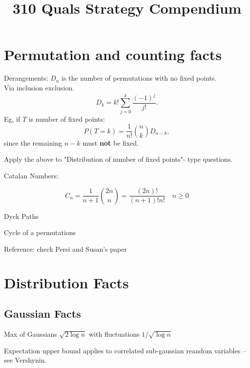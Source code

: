 \documentclass{article}
\title{310 Quals Strategy Compendium}
\begin{document}
\maketitle

\section{Permutation and counting facts}
\begin{fact}
Derangements: $D_n$ is the number of permutations with no fixed points.\\

Via inclusion exclusion.
$$D_k = k! \sum_{j=0}^{k} \frac{(-1)^j}{j!}.$$
Eg, if $T$ is number of fixed points:
$$P(T=k) = \frac{1}{n!} \binom{n}{k} D_{n-k},$$
since the remaining $n-k$ must \textbf{not} be fixed.

    
\end{fact}
Apply the above to "Distribution of number of fixed points"- type questions. 

\begin{fact}
	Catalan Numbers: 
	
	$$C_n = \frac{1}{n+1} \binom{2n}{n} = \frac{(2n)!}{(n+1)! n!} \quad n\geq 0$$
	
	
		Dyck Paths 
\end{fact}

\begin{definition}[Cycles]
	Cycle of a permutations
\end{definition}

\begin{definition}[Descents]
	
\end{definition}

Reference: check Persi and Susan's paper


\section{Distribution Facts}
\subsection{Gaussian Facts}
\begin{fact}
	Max of Gaussians $\sqrt{2\log n}$ with fluctuations $1/\sqrt{\log n} $
\end{fact}
\begin{fact} 
	Expectation upper bound applies to correlated sub-gaussian reandom variables -- see Vershynin. 
\end{fact}
\begin{fact}
	
\end{fact}
\end{document}

